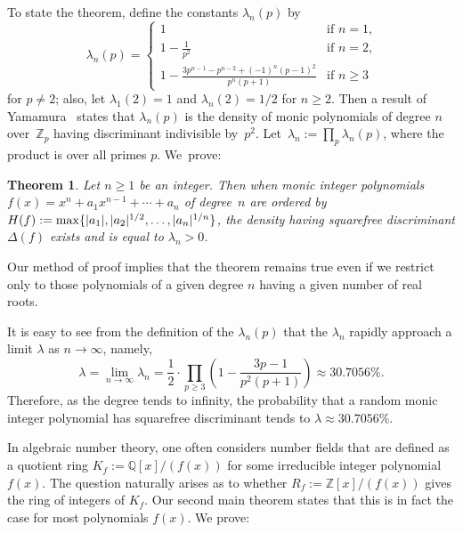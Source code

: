 \documentclass[11pt]{article}
\def\Z{{\mathbb Z}}
\def\Q{{\mathbb Q}}
\def\Z{{\mathbb Z}}
\def\Q{{\mathbb Q}}
\def\max{{\rm max}}
\newtheorem{theorem}{Theorem}[section]
\begin{document}
To state the theorem, define the constants $\lambda_n(p)$ by
\begin{equation}\label{jos}
\lambda_n(p)=\left\{
\begin{array}{cl}
1 & \mbox{if $n =1$,}\\[.0875in]
1-\displaystyle\frac1{p^2} & \mbox{if $n= 2$,}\\[.1875in]
1-\displaystyle \frac{3p^{n-1}-p^{n-2}+(-1)^n(p-1)^2}{p^n(p+1)} & \mbox{if $n\geq 3$}
\end{array}\right.
\end{equation}
for $p\neq 2$; also, let $\lambda_1(2)=1$ and $\lambda_n(2)=1/2$ for
$n\geq2$.  Then a result of Yamamura~\cite[Proposition~3]{Yamamura2}
states
that $\lambda_n(p)$ is the density of monic polynomials of degree $n$ over~$\Z_p$
having discriminant indivisible by~$p^2$.
Let~$\lambda_n:=\prod_p\lambda_n(p)$, where the product is over all
primes $p$.  We~prove:

\begin{theorem}\label{polydisc2}
Let $n\geq1$ be an integer.  Then when
monic integer polynomials $f(x)=x^n+a_1x^{n-1}+\cdots+a_n$ of
degree~$n$ are ordered by $H(f):=
\max\{|a_1|,|a_2|^{1/2},\ldots,|a_n|^{1/n}\}$, the density having
squarefree discriminant $\Delta(f)$ exists and is equal to $\lambda_n>0$.
\end{theorem}
Our method of proof implies that the theorem remains true even if we
restrict only to those polynomials of a given degree $n$ having a
given number of real roots.

It is easy to see from the definition of the $\lambda_n(p)$ that the
$\lambda_n$ rapidly approach a limit $\lambda$ as $n\to\infty$,
namely,
\begin{equation}
\lambda=\lim_{n\to\infty} \lambda_n = \frac12 \cdot \prod_{p\geq 3}
\left(1-\displaystyle\frac{3p-1}{p^2(p+1)}\right)
\approx 30.7056\%.
\end{equation}
Therefore, as the degree tends to infinity, the
probability that a random monic integer polynomial has squarefree
discriminant tends to $\lambda\approx 30.7056\%$.

In algebraic number theory, one often considers number fields that are
defined as a quotient ring $K_f:=\Q[x]/(f(x))$ for some irreducible
integer polynomial $f(x)$. The question naturally arises as to whether
$R_f:=\Z[x]/(f(x))$ gives the ring of integers of $K_f$.  Our second
main theorem states that this is in fact the case for {most}
polynomials $f(x)$. We prove:
\end{document}
